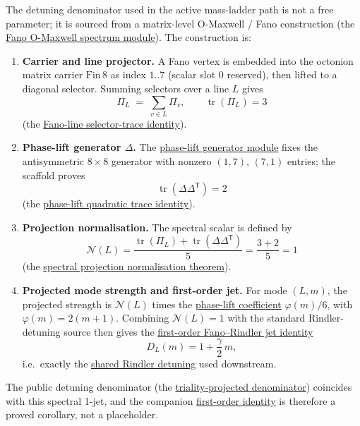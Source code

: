 \documentclass[11pt]{article}
\begin{document}
The detuning denominator used in the active mass-ladder path is
not a free parameter; it is sourced from a matrix-level
O-Maxwell / Fano construction (the
\hyperref[lean:fano-spectrum]{Fano O-Maxwell spectrum module}).
The construction is:

\begin{enumerate}[leftmargin=2em]
  \item \textbf{Carrier and line projector.} A Fano vertex is
  embedded into the octonion matrix carrier $\mathrm{Fin}\,8$
  as index $1..7$ (scalar slot $0$ reserved), then lifted to a
  diagonal selector. Summing selectors over a line $L$ gives
  \[
    \Pi_L \;=\; \sum_{v\in L}\Pi_v,
    \qquad \operatorname{tr}(\Pi_L)=3
  \]
  (the
  \hyperref[lean:fano-line-trace]{Fano-line selector-trace
  identity}).

  \item \textbf{Phase-lift generator $\Delta$.} The
  \hyperref[lean:phase-lift]{phase-lift generator module} fixes
  the antisymmetric $8\times 8$ generator with nonzero
  $(1,7)$, $(7,1)$ entries; the scaffold proves
  \[
    \operatorname{tr}(\Delta\Delta^{\mathsf T})=2
  \]
  (the
  \hyperref[lean:phase-lift-quadratic]{phase-lift quadratic
  trace identity}).

  \item \textbf{Projection normalisation.} The spectral scalar
  is defined by
  \[
    \mathcal{N}(L)=\frac{\operatorname{tr}(\Pi_L)+\operatorname{tr}(\Delta\Delta^{\mathsf T})}{5}
    =\frac{3+2}{5}=1
  \]
  (the
  \hyperref[lean:fano-spectral-norm]{spectral projection
  normalisation theorem}).

  \item \textbf{Projected mode strength and first-order jet.}
  For mode $(L,m)$, the projected strength is $\mathcal{N}(L)$
  times the
  \hyperref[lean:phase-lift-coeff]{phase-lift coefficient}
  $\varphi(m)/6$, with $\varphi(m)=2(m+1)$. Combining
  $\mathcal{N}(L)=1$ with the standard Rindler-detuning
  source then gives the
  \hyperref[lean:fano-rindler-1jet]{first-order Fano--Rindler
  jet identity}
  \[
    D_L(m)=1+\frac{\gamma}{2}\,m,
  \]
  i.e.\ exactly the
  \hyperref[lean:rindler-shared]{shared Rindler detuning}
  used downstream.
\end{enumerate}

The public detuning denominator (the
\hyperref[lean:triality-denominator]{triality-projected
denominator}) coincides with this spectral 1-jet, and the
companion
\hyperref[lean:triality-denominator-firstorder]{first-order
identity} is therefore a proved corollary, not a placeholder.
\end{document}
